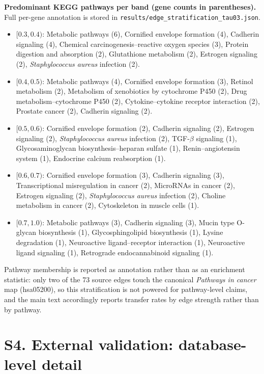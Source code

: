\documentclass[11pt]{article}
\begin{document}
\noindent\textbf{Predominant KEGG pathways per band (gene counts in parentheses).}
Full per-gene annotation is stored in \texttt{results/edge\_stratification\_tau03.json}.
\begin{itemize}\itemsep2pt
\item $[0.3,0.4)$: Metabolic pathways (6), Cornified envelope formation (4),
Cadherin signaling (4), Chemical carcinogenesis--reactive oxygen species (3),
Protein digestion and absorption (2), Glutathione metabolism (2), Estrogen
signaling (2), \textit{Staphylococcus aureus} infection (2).
\item $[0.4,0.5)$: Metabolic pathways (4), Cornified envelope formation (3),
Retinol metabolism (2), Metabolism of xenobiotics by cytochrome P450 (2), Drug
metabolism--cytochrome P450 (2), Cytokine--cytokine receptor interaction (2),
Prostate cancer (2), Cadherin signaling (2).
\item $[0.5,0.6)$: Cornified envelope formation (2), Cadherin signaling (2),
Estrogen signaling (2), \textit{Staphylococcus aureus} infection (2),
TGF-$\beta$ signaling (1), Glycosaminoglycan biosynthesis--heparan sulfate (1),
Renin--angiotensin system (1), Endocrine calcium reabsorption (1).
\item $[0.6,0.7)$: Cornified envelope formation (3), Cadherin signaling (3),
Transcriptional misregulation in cancer (2), MicroRNAs in cancer (2), Estrogen
signaling (2), \textit{Staphylococcus aureus} infection (2), Choline metabolism in
cancer (2), Cytoskeleton in muscle cells (1).
\item $[0.7,1.0)$: Metabolic pathways (3), Cadherin signaling (3), Mucin type
O-glycan biosynthesis (1), Glycosphingolipid biosynthesis (1), Lysine degradation
(1), Neuroactive ligand--receptor interaction (1), Neuroactive ligand signaling
(1), Retrograde endocannabinoid signaling (1).
\end{itemize}

Pathway membership is reported as annotation rather than as an enrichment
statistic: only two of the 73 source edges touch the canonical \emph{Pathways in
cancer} map (hsa05200), so this stratification is not powered for pathway-level
claims, and the main text accordingly reports transfer rates by edge strength
rather than by pathway.

\section*{S4. External validation: database-level detail}
\end{document}
